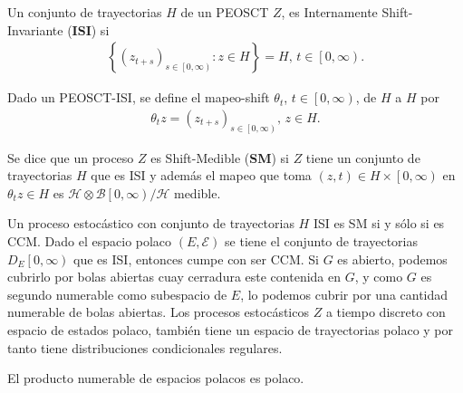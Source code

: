 \begin{Def}
Un conjunto de trayectorias $H$ de un PEOSCT $Z$, es Internamente Shift-Invariante (\textbf{ISI}) si 
\begin{eqnarray*}
\left\{\left(z_{t+s}\right)_{s\in\left[0,\infty\right)}:z\in H\right\}=H\textrm{, }t\in\left[0,\infty\right).
\end{eqnarray*}
\end{Def}


\begin{Def}
Dado un PEOSCT-ISI, se define el mapeo-shift $\theta_{t}$, $t\in\left[0,\infty\right)$, de $H$ a $H$ por 
\begin{eqnarray*}
\theta_{t}z=\left(z_{t+s}\right)_{s\in\left[0,\infty\right)}\textrm{, }z\in H.
\end{eqnarray*}
\end{Def}

\begin{Def}
Se dice que un proceso $Z$ es Shift-Medible (\textbf{SM}) si $Z$ tiene un conjunto de trayectorias $H$ que es ISI y adem\'as el mapeo que toma $\left(z,t\right)\in H\times\left[0,\infty\right)$ en $\theta_{t}z\in H$ es $\mathcal{H}\otimes\mathcal{B}\left[0,\infty\right)/\mathcal{H}$ medible.
\end{Def}

Un proceso estoc\'astico con conjunto de trayectorias $H$ ISI es SM si y s\'olo si es CCM. Dado el espacio polaco $\left(E,\mathcal{E}\right)$ se tiene el  conjunto de trayectorias $D_{E}\left[0,\infty\right)$ que es ISI, entonces cumpe con ser CCM. Si $G$ es abierto, podemos cubrirlo por bolas abiertas cuay cerradura este contenida en $G$, y como $G$ es segundo numerable como subespacio de $E$, lo podemos cubrir por una cantidad numerable de bolas abiertas. Los procesos estoc\'asticos $Z$ a tiempo discreto con espacio de estados polaco, tambi\'en tiene un espacio de trayectorias polaco y por tanto tiene distribuciones condicionales regulares.

\begin{Teo}
El producto numerable de espacios polacos es polaco.
\end{Teo}


